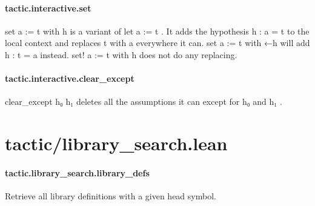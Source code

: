 \documentclass{article}
\begin{document}
\paragraph{tactic.interactive.set}
\par
\colorbox[RGB]{253,246,227}{{{{\color[RGB]{101, 123, 131} set a  }}}{{{\color[RGB]{181, 137, 0} := }}}{{{\color[RGB]{101, 123, 131}  t  }}}{{{\color[RGB]{133, 153, 0} with }}}{{{\color[RGB]{101, 123, 131}  h }}}} is a variant of 
\colorbox[RGB]{253,246,227}{{{{\color[RGB]{133, 153, 0} let }}}{{{\color[RGB]{101, 123, 131}  a  }}}{{{\color[RGB]{181, 137, 0} := }}}{{{\color[RGB]{101, 123, 131}  t }}}}.
It adds the hypothesis 
\colorbox[RGB]{253,246,227}{{{{\color[RGB]{101, 123, 131} h : a  }}}{{{\color[RGB]{181, 137, 0} = }}}{{{\color[RGB]{101, 123, 131}  t }}}} to the local context and replaces 
\colorbox[RGB]{253,246,227}{{{{\color[RGB]{101, 123, 131} t }}}} with 
\colorbox[RGB]{253,246,227}{{{{\color[RGB]{101, 123, 131} a }}}} everywhere it can.
\colorbox[RGB]{253,246,227}{{{{\color[RGB]{101, 123, 131} set a  }}}{{{\color[RGB]{181, 137, 0} := }}}{{{\color[RGB]{101, 123, 131}  t  }}}{{{\color[RGB]{133, 153, 0} with }}}{{{\color[RGB]{101, 123, 131}  ←h }}}} will add 
\colorbox[RGB]{253,246,227}{{{{\color[RGB]{101, 123, 131} h : t  }}}{{{\color[RGB]{181, 137, 0} = }}}{{{\color[RGB]{101, 123, 131}  a }}}} instead.
\colorbox[RGB]{253,246,227}{{{{\color[RGB]{101, 123, 131} set! a  }}}{{{\color[RGB]{181, 137, 0} := }}}{{{\color[RGB]{101, 123, 131}  t  }}}{{{\color[RGB]{133, 153, 0} with }}}{{{\color[RGB]{101, 123, 131}  h }}}} does not do any replacing.
\paragraph{tactic.interactive.clear\_except}
\par
\colorbox[RGB]{253,246,227}{{{{\color[RGB]{101, 123, 131} clear\_except h₀ h₁ }}}} deletes all the assumptions it can except for 
\colorbox[RGB]{253,246,227}{{{{\color[RGB]{101, 123, 131} h₀ }}}} and 
\colorbox[RGB]{253,246,227}{{{{\color[RGB]{101, 123, 131} h₁ }}}}.
\section{tactic/library\_search.lean}\paragraph{tactic.library\_search.library\_defs}
\par
Retrieve all library definitions with a given head symbol.
\end{document}
